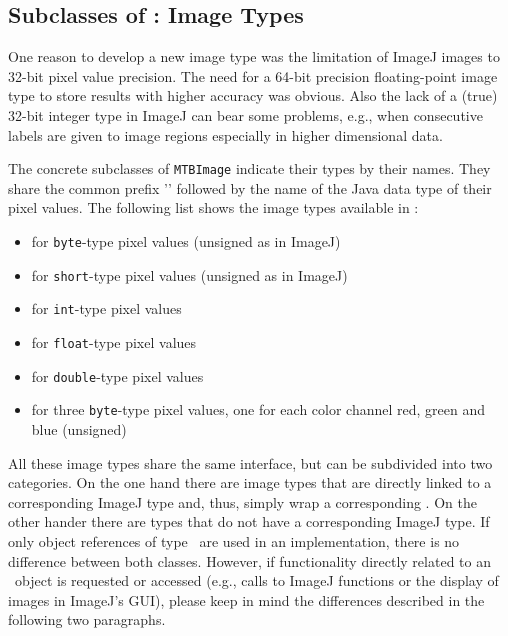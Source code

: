 \subsection{Subclasses of \mtbimg: Image Types}
One reason to develop a new image type was the limitation of ImageJ
images to 32-bit pixel value precision. The need for a 64-bit precision
floating-point image type to store results with higher accuracy was obvious.
Also the lack of a (true) 32-bit integer type in ImageJ can bear some
problems, e.g., when consecutive labels are given to image regions especially in
higher dimensional data. 

The concrete subclasses of {\tt MTBImage} indicate their types by their names. 
They share the common prefix '\mtbimg' followed by the name of the Java data type of their pixel values. 
The following list shows the image types available in \mitobo:
\begin{itemize}
  \item {} for {\tt byte}-type pixel values (unsigned as
  in ImageJ)
  \item {} for {\tt short}-type pixel values (unsigned as in
  ImageJ)
  \item {} for {\tt int}-type pixel values
  \item {} for {\tt float}-type pixel values
  \item {} for {\tt double}-type pixel values
  \item {} for three {\tt byte}-type pixel values, one
  for each color channel red, green and blue (unsigned)
\end{itemize}

All these image types share the same interface, but can be subdivided into two categories.
On the one hand there are image types that are directly linked to a corresponding ImageJ type and, thus,
simply wrap a corresponding \imgplus. On the other hander there are types that do not have a corresponding
ImageJ type. If only object references of type \mtbimg\ are used in an implementation, there is no difference 
between both classes. However, if functionality directly related to an \imgplus~object is requested or accessed 
(e.g., calls to ImageJ functions or the display of images in ImageJ's GUI), please keep in mind the differences
described in the following two paragraphs.

